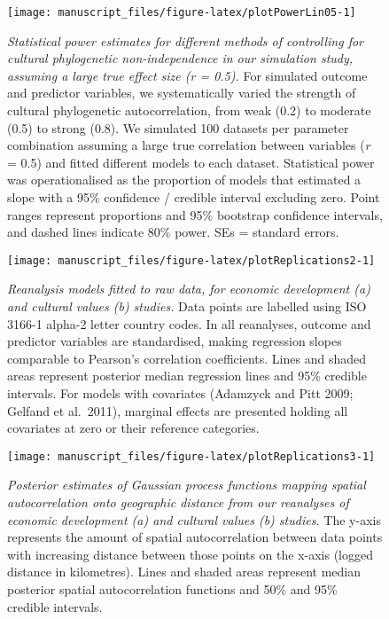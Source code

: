 \documentclass[
  man,floatsintext]{apa6}
\begin{document}
\begin{figure}[H]
\texttt{[image: manuscript\_files/figure-latex/plotPowerLin05-1]} \caption{\emph{Statistical power estimates for different methods of controlling for cultural phylogenetic non-independence in our simulation study, assuming a large true effect size (r = 0.5).} For simulated outcome and predictor variables, we systematically varied the strength of cultural phylogenetic autocorrelation, from weak (0.2) to moderate (0.5) to strong (0.8). We simulated 100 datasets per parameter combination assuming a large true correlation between variables (\emph{r} = 0.5) and fitted different models to each dataset. Statistical power was operationalised as the proportion of models that estimated a slope with a 95\% confidence / credible interval excluding zero. Point ranges represent proportions and 95\% bootstrap confidence intervals, and dashed lines indicate 80\% power. SEs = standard errors.}\label{fig:plotPowerLin05}
\end{figure}

\newpage



\begin{figure}[H]
\texttt{[image: manuscript\_files/figure-latex/plotReplications2-1]} \caption{\emph{Reanalysis models fitted to raw data, for economic development (a) and cultural values (b) studies.} Data points are labelled using ISO 3166-1 alpha-2 letter country codes. In all reanalyses, outcome and predictor variables are standardised, making regression slopes comparable to Pearson's correlation coefficients. Lines and shaded areas represent posterior median regression lines and 95\% credible intervals. For models with covariates (Adamzyck and Pitt 2009; Gelfand et al.~2011), marginal effects are presented holding all covariates at zero or their reference categories.}\label{fig:plotReplications2}
\end{figure}

\newpage



\begin{figure}[H]
\texttt{[image: manuscript\_files/figure-latex/plotReplications3-1]} \caption{\emph{Posterior estimates of Gaussian process functions mapping spatial autocorrelation onto geographic distance from our reanalyses of economic development (a) and cultural values (b) studies.} The y-axis represents the amount of spatial autocorrelation between data points with increasing distance between those points on the x-axis (logged distance in kilometres). Lines and shaded areas represent median posterior spatial autocorrelation functions and 50\% and 95\% credible intervals.}\label{fig:plotReplications3}
\end{figure}
\end{document}

